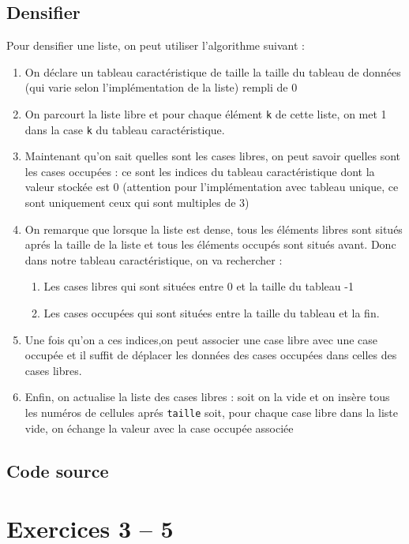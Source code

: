 \documentclass{report}
\newcommand{\code}{\lstinline[style=customjava]}
\begin{document}
    \section{Densifier}
      Pour densifier une liste, on peut utiliser l'algorithme suivant : 
      \begin{enumerate}
        \item On déclare un tableau caractéristique de taille la taille du tableau de données (qui varie selon l'implémentation de la liste) rempli de 0
        \item On parcourt la liste libre et pour chaque élément \code{k} de cette liste, on met 1 dans la case \code{k} du tableau caractéristique.
        \item Maintenant qu'on sait quelles sont les cases libres, on peut savoir quelles sont les cases occupées : ce sont les indices du tableau caractéristique dont la valeur stockée est 0 (attention pour l'implémentation avec tableau unique, ce sont uniquement ceux qui sont multiples de 3)
        \item {On remarque que lorsque la liste est dense, tous les éléments libres sont situés aprés la taille de la liste et tous les éléments occupés sont situés avant. Donc dans notre tableau caractéristique, on va rechercher :
          \begin{enumerate}
          \item Les cases libres qui sont situées entre 0 et la taille du tableau -1
          \item Les cases occupées qui sont situées entre la taille du tableau et la fin.
          \end{enumerate}}
        \item Une fois qu'on a ces indices,on peut associer une case libre avec une case occupée et il suffit de déplacer les données des cases occupées dans celles des cases libres.
        \item Enfin, on actualise la liste des cases libres : soit on la vide et on insère tous les numéros de cellules aprés \code{taille} soit, pour chaque case libre dans la liste vide, on échange la valeur avec la case occupée associée
      \end{enumerate}
    \section{Code source}
      
      
  \chapter*{Exercices 3 -- 5}
  \addtocounter{chapter}{1}
  \setcounter{section}{0}
\end{document}
